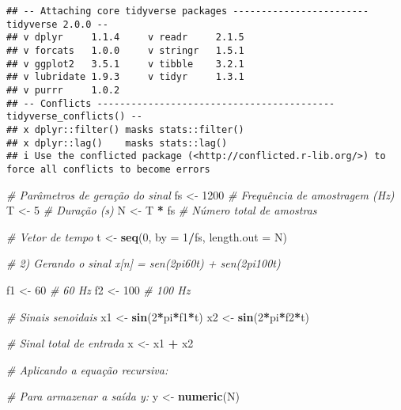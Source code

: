\documentclass[
]{article}
\newenvironment{Shaded}{\begin{snugshade}}{\end{snugshade}}
\newcommand{\AttributeTok}[1]{\textcolor[rgb]{0.13,0.29,0.53}{#1}}
\newcommand{\CommentTok}[1]{\textcolor[rgb]{0.56,0.35,0.01}{\textit{#1}}}
\newcommand{\DecValTok}[1]{\textcolor[rgb]{0.00,0.00,0.81}{#1}}
\newcommand{\FunctionTok}[1]{\textcolor[rgb]{0.13,0.29,0.53}{\textbf{#1}}}
\newcommand{\NormalTok}[1]{#1}
\newcommand{\OtherTok}[1]{\textcolor[rgb]{0.56,0.35,0.01}{#1}}
\newcommand{\SpecialCharTok}[1]{\textcolor[rgb]{0.81,0.36,0.00}{\textbf{#1}}}
\begin{document}
\begin{verbatim}
## -- Attaching core tidyverse packages ------------------------ tidyverse 2.0.0 --
## v dplyr     1.1.4     v readr     2.1.5
## v forcats   1.0.0     v stringr   1.5.1
## v ggplot2   3.5.1     v tibble    3.2.1
## v lubridate 1.9.3     v tidyr     1.3.1
## v purrr     1.0.2     
## -- Conflicts ------------------------------------------ tidyverse_conflicts() --
## x dplyr::filter() masks stats::filter()
## x dplyr::lag()    masks stats::lag()
## i Use the conflicted package (<http://conflicted.r-lib.org/>) to force all conflicts to become errors
\end{verbatim}

\begin{Shaded}
\begin{Highlighting}[]
\CommentTok{\# Parâmetros de geração do sinal}
\NormalTok{fs }\OtherTok{\textless{}{-}} \DecValTok{1200}           \CommentTok{\# Frequência de amostragem (Hz)}
\NormalTok{T }\OtherTok{\textless{}{-}} \DecValTok{5}               \CommentTok{\# Duração (s)}
\NormalTok{N }\OtherTok{\textless{}{-}}\NormalTok{ T }\SpecialCharTok{*}\NormalTok{ fs          }\CommentTok{\# Número total de amostras}

\CommentTok{\# Vetor de tempo}
\NormalTok{t }\OtherTok{\textless{}{-}} \FunctionTok{seq}\NormalTok{(}\DecValTok{0}\NormalTok{, }\AttributeTok{by =} \DecValTok{1}\SpecialCharTok{/}\NormalTok{fs, }\AttributeTok{length.out =}\NormalTok{ N)}

\CommentTok{\# 2) Gerando o sinal x[n] = sen(2pi60t) + sen(2pi100t)}

\NormalTok{f1 }\OtherTok{\textless{}{-}} \DecValTok{60}             \CommentTok{\# 60 Hz}
\NormalTok{f2 }\OtherTok{\textless{}{-}} \DecValTok{100}            \CommentTok{\# 100 Hz}

\CommentTok{\# Sinais senoidais}
\NormalTok{x1 }\OtherTok{\textless{}{-}} \FunctionTok{sin}\NormalTok{(}\DecValTok{2}\SpecialCharTok{*}\NormalTok{pi}\SpecialCharTok{*}\NormalTok{f1}\SpecialCharTok{*}\NormalTok{t)}
\NormalTok{x2 }\OtherTok{\textless{}{-}} \FunctionTok{sin}\NormalTok{(}\DecValTok{2}\SpecialCharTok{*}\NormalTok{pi}\SpecialCharTok{*}\NormalTok{f2}\SpecialCharTok{*}\NormalTok{t)}

\CommentTok{\# Sinal total de entrada}
\NormalTok{x }\OtherTok{\textless{}{-}}\NormalTok{ x1 }\SpecialCharTok{+}\NormalTok{ x2}

\CommentTok{\# Aplicando a equação recursiva:}

\CommentTok{\# Para armazenar a saída y:}
\NormalTok{y }\OtherTok{\textless{}{-}} \FunctionTok{numeric}\NormalTok{(N)}


\end{Highlighting}
\end{Shaded}
\end{document}
